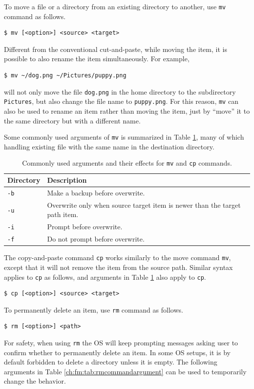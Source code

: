 To move a file or a directory from an existing directory to another, use \verb|mv| command as follows.
\begin{lstlisting}
$ mv [<option>] <source> <target>
\end{lstlisting}
Different from the conventional cut-and-paste, while moving the item, it is possible to also rename the item simultaneously. For example,
\begin{lstlisting}
$ mv ~/dog.png ~/Pictures/puppy.png
\end{lstlisting}
will not only move the file \verb|dog.png| in the home directory to the subdirectory \verb|Pictures|, but also change the file name to \verb|puppy.png|. For this reason, \verb|mv| can also be used to rename an item rather than moving the item, just by ``move'' it to the same directory but with a different name.

Some commonly used arguments of \verb|mv| is summarized in Table \ref{ch:fm:tab:mvcpcommandargument}, many of which handling existing file with the same name in the destination directory.

\begin{table}[!htb]
  \centering \caption{Commonly used arguments and their effects for \texttt{mv} and \texttt{cp} commands.}\label{ch:fm:tab:mvcpcommandargument}
  \begin{tabularx}{\textwidth}{lX}
    \hline
    Directory & Description \\ \hline
    \verb|-b| & Make a backup before overwrite. \\ 
    \verb|-u| & Overwrite only when source target item is newer than the target path item. \\ 
    \verb|-i| & Prompt before overwrite. \\ 
    \verb|-f| & Do not prompt before overwrite. \\
    \hline
  \end{tabularx}
\end{table}

The copy-and-paste command \verb|cp| works similarly to the move command \verb|mv|, except that it will not remove the item from the source path. Similar syntax applies to \verb|cp| as follows, and arguments in Table \ref{ch:fm:tab:mvcpcommandargument} also apply to \verb|cp|.
\begin{lstlisting}
$ cp [<option>] <source> <target>
\end{lstlisting}

To permanently delete an item, use \verb|rm| command as follows.
\begin{lstlisting}
$ rm [<option>] <path>
\end{lstlisting}
For safety, when using \verb|rm| the OS will keep prompting messages asking user to confirm whether to permanently delete an item. In some OS setups, it is by default forbidden to delete a directory unless it is empty. The following arguments in Table \ref{ch:fm:tab:rmcommandargument} can be used to temporarily change the behavior.

